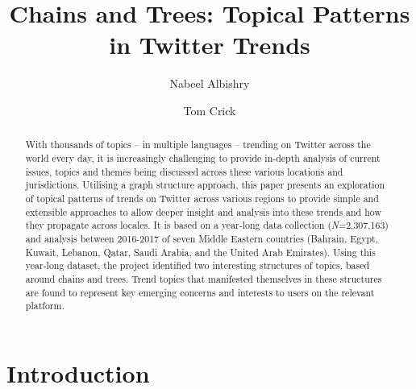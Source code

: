\documentclass{comjnl}
\begin{document}
\title[Chains and Trees: Topical Patterns in Twitter Trends]{Chains and Trees: Topical Patterns in Twitter Trends}
\author{Nabeel Albishry}%
\author{Tom Crick}%





\begin{abstract}
With thousands of topics -- in multiple languages -- trending on Twitter across the world every day, it is increasingly challenging to provide in-depth analysis of current issues, topics and themes being discussed across these various locations and jurisdictions. Utilising a graph structure approach, this paper presents an exploration of topical patterns of trends on Twitter across various regions to provide simple and extensible approaches to allow deeper insight and analysis into these trends and how they propagate across locales. It is based on a year-long data collection ({\emph{N}}=2,307,163) and analysis between 2016-2017 of seven Middle Eastern countries (Bahrain, Egypt, Kuwait, Lebanon, Qatar, Saudi Arabia, and the United Arab Emirates). Using this year-long dataset, the project identified two interesting structures of topics, based around chains and trees. Trend topics that manifested themselves in these structures are found to represent key emerging concerns and interests to users on the relevant platform.
\end{abstract}

\maketitle


\section{Introduction}\label{intro}
\end{document}
